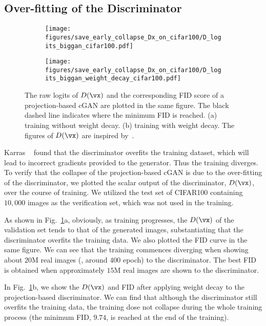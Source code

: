 \documentclass[paper_2425.tex]{subfiles}
\begin{document}
\subsection{Over-fitting of the Discriminator}

\begin{figure}[!t]
  \begin{subfigure}{0.49\linewidth}
    \centering
\texttt{[image: figures/save\_early\_collapse\_Dx\_on\_cifar100/D\_logits\_biggan\_cifar100.pdf]}
\caption{}
  \end{subfigure}
\begin{subfigure}{.49\linewidth}
    \centering
    \texttt{[image: figures/save\_early\_collapse\_Dx\_on\_cifar100/D\_logits\_biggan\_weight\_decay\_cifar100.pdf]}
    \caption{}
  \end{subfigure}
  \vspace{-0.3cm}
  \caption{The raw logits of $D(\vx)$ and the corresponding FID score of a projection-based cGAN are plotted in the same figure. The black dashed line indicates where the minimum FID is reached. (a) training without weight decay. (b) training with weight decay.  The figures of $D(\vx)$ are inspired by~\cite{karras2020Training}.}
  \label{apx:fig:early_collapse}
\end{figure}


Karras \etal~\cite{karras2020Training} found that the discriminator overfits the training dataset, which will lead to incorrect gradients provided to the generator. Thus the training diverges. To verify that the collapse of the projection-based cGAN is due to the over-fitting of the discriminator, we plotted the scalar output of the discriminator, $D(\vx)$, over the course of training. We utilized the test set of CIFAR100 containing $10,000$ images as the verification set, which was not used in the training.

As shown in Fig.~\ref{apx:fig:early_collapse}a, obviously, as training progresses, the $D(\vx)$ of the validation set tends to that of the generated images, substantiating that the discriminator overfits the training data. We also plotted the FID curve in the same figure. We can see that the training commences diverging when showing about $20$M real images (\ie, around $400$ epoch) to the discriminator. The best FID is obtained when approximately $15$M real images are shown to the discriminator.

In Fig.~\ref{apx:fig:early_collapse}b, we show the $D(\vx)$ and FID after applying weight decay to the projection-based discriminator. We can find that although the discriminator still overfits the training data, the training dose not collapse during the whole training process (the minimum FID, $9.74$, is reached at the end of the training).
\end{document}
